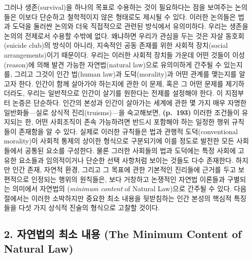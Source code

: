 그러나 생존(survival)을 하나의 목표로 수용하는 것이 필요하다는 점을
보여주는 논의들은 이보다 단순하고 철학적이지 않은 형태로도 제시될 수
있다. 이러한 논의들은 법과 도덕을 둘러싼 논의와 더욱 직접적으로 관련된
방식에서 유의미하다. 우리는 생존을 논의의 전제로서 수용할 수밖에 없다.
왜냐하면 우리가 관심을 두는 것은 자살 동호회(suicide club)의 방식이
아니라, 지속적인 공동 존재를 위한 사회적 장치(social arrangements)이기
때문이다. 우리는 이러한 사회적 장치들 가운데 어떤 것들이 이성(reason)에
의해 발견 가능한 자연법(natural law)으로 유의미하게 간주될 수 있는지를,
그리고 그것이 인간 법(human law)과 도덕(morality)과 어떤 관계를 맺는지를
알고자 한다. 인간이  함께 살아가야 하는지에 관한 이 문제,
혹은 그 어떤 문제를 제기하더라도, 우리는 일반적으로 인간이 살기를
원한다는 전제를 설정해야 한다. 이 지점부터 논증은 단순하다. 인간의
본성과 인간이 살아가는 세계에 관한 몇 가지 매우 자명한 일반화들---실로
상식적 진리(truisms)---을 숙고해보면, \textbf{(p.~193)} 이러한 조건들이
유지되는 한, 어떤 사회조직이 존속 가능하려면 반드시 포함해야 하는 일정한
행위 규칙들이 존재함을 알 수 있다. 실제로 이러한 규칙들은 법과 관행적
도덕(conventional morality)이 사회적 통제의 상이한 형식으로 구분되기에
이를 정도로 발전한 모든 사회들에서 공통된 요소를 구성한다. 물론 그러한
사회들의 법과 도덕에는 특정 사회에 고유한 요소들과 임의적이거나 단순한
선택 사항처럼 보이는 것들도 다수 존재한다. 하지만 인간 존재, 자연적
환경, 그리고 그 목표에 관한 기본적인 진리들에 근거를 두고 보편적으로
인정되는 행위의 원칙들은, 보다 거창하고 논쟁적인 자연법 이론들과
구별되는 의미에서 자연법의 (\emph{minimum content} of
Natural Law)으로 간주될 수 있다. 다음 절에서는 이러한 소박하지만 중요한
최소 내용을 뒷받침하는 인간 본성의 핵심적 특징들을 다섯 가지 상식적
진술의 형식으로 고찰할 것이다.

\subsection{2. 자연법의 최소 내용 (The Minimum Content of Natural
Law)}\label{uxc790uxc5f0uxbc95uxc758-uxcd5cuxc18c-uxb0b4uxc6a9-the-minimum-content-of-natural-law}

